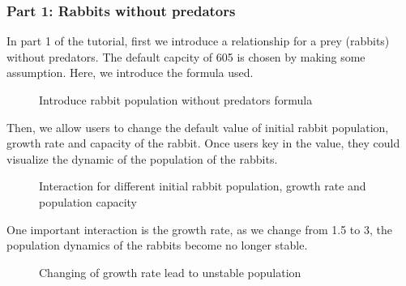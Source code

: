 \documentclass{article}
\begin{document}
\begin{normalsize}
		\subsubsection{Part 1: Rabbits without predators}
		In part 1 of the tutorial, first we introduce a relationship for a prey (rabbits) without predators. The default capcity of 605 is chosen by making some assumption. Here, we introduce the formula used. 
			\begin{figure}[H]
			\caption{Introduce rabbit population without predators formula}
			\end{figure}
		
		Then, we allow users to change the default value of initial rabbit population,  growth rate and capacity of the rabbit. Once users key in the value, they could visualize the dynamic of the population of the rabbits.
		\begin{figure}[H]
			\caption{Interaction for different initial rabbit population, growth rate and population capacity }
		\end{figure}
		
		One important interaction is the growth rate, as we change from 1.5 to 3, the population dynamics of the rabbits become no longer stable.
			\begin{figure}[H]
			\caption{Changing of growth rate lead to unstable population }
		\end{figure}
		

\end{normalsize}
\end{document}
